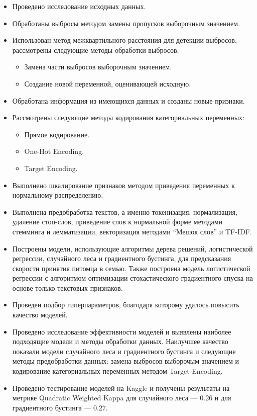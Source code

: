 \documentclass[14pt]{mmcs_article}
\begin{document}
\begin{itemize}
	\item Проведено исследование исходных данных.
	\item Обработаны выбросы методом замены пропусков выборочным значением.
	\item Использован метод межквартильного расстояния для детекции выбросов, рассмотрены следующие методы обработки выбросов:
	\begin{itemize}
		\item Замена части выбросов выборочным значением.
		\item Создание новой переменной, оценивающей исходную.
	\end{itemize}
	\item Обработана информация из имеющихся данных и созданы новые признаки.
	\item Рассмотрены следующие методы кодирования категориальных переменных:
	\begin{itemize}
		\item Прямое кодирование.
		\item One-Hot Encoding.
		\item Target Encoding.
	\end{itemize}
	\item Выполнено шкалирование признаков методом приведения переменных к нормальному распределению.
	\item Выполнена предобработка текстов, а именно токенизация, нормализация, удаление стоп-слов, приведение слов к нормальной форме методами стемминга и лемматизации, векторизация методами ``Мешок слов'' и TF-IDF.
	\item Построены модели, использующие алгоритмы дерева решений, логистической регрессии, случайного леса и градиентного бустинга, для предсказания скорости принятия питомца в семью. Также построена модель логистической регрессии с алгоритмом оптимизации стохастического градиентного спуска на основе только текстовых признаков.
	\item Проведен подбор гиперпараметров, благодаря которому удалось повысить качество моделей.
	\item Проведено исследование эффективности моделей и выявлены наиболее подходящие модели и методы обработки данных. Наилучшее качество показали модели случайного леса и градиентного бустинга и следующие методы предобработки данных: замена выбросов выборочым значением и кодирование категориальных переменных методом Target Encoding.
	\item Проведено тестирование моделей на Kaggle и получены результаты на метрике Quadratic Weighted Kappa для случайного леса --- 0.26 и для градиентного бустинга --- 0.27.
\end{itemize}
\end{document}
